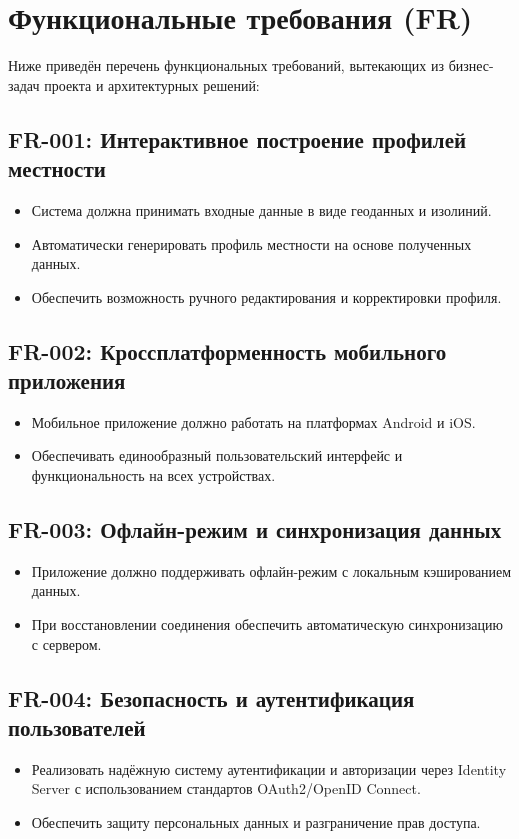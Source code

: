 \documentclass[a4paper,12pt]{article}
\begin{document}
\newpage
\section{Функциональные требования (FR)}

Ниже приведён перечень функциональных требований, вытекающих из бизнес-задач проекта и архитектурных решений:

\subsection*{FR-001: Интерактивное построение профилей местности}
\begin{itemize}[leftmargin=1cm]
    \item Система должна принимать входные данные в виде геоданных и изолиний.
    \item Автоматически генерировать профиль местности на основе полученных данных.
    \item Обеспечить возможность ручного редактирования и корректировки профиля.
\end{itemize}

\subsection*{FR-002: Кроссплатформенность мобильного приложения}
\begin{itemize}[leftmargin=1cm]
    \item Мобильное приложение должно работать на платформах Android и iOS.
    \item Обеспечивать единообразный пользовательский интерфейс и функциональность на всех устройствах.
\end{itemize}

\subsection*{FR-003: Офлайн-режим и синхронизация данных}
\begin{itemize}[leftmargin=1cm]
    \item Приложение должно поддерживать офлайн-режим с локальным кэшированием данных.
    \item При восстановлении соединения обеспечить автоматическую синхронизацию с сервером.
\end{itemize}

\subsection*{FR-004: Безопасность и аутентификация пользователей}
\begin{itemize}[leftmargin=1cm]
    \item Реализовать надёжную систему аутентификации и авторизации через Identity Server с использованием стандартов OAuth2/OpenID Connect.
    \item Обеспечить защиту персональных данных и разграничение прав доступа.
\end{itemize}
\end{document}
